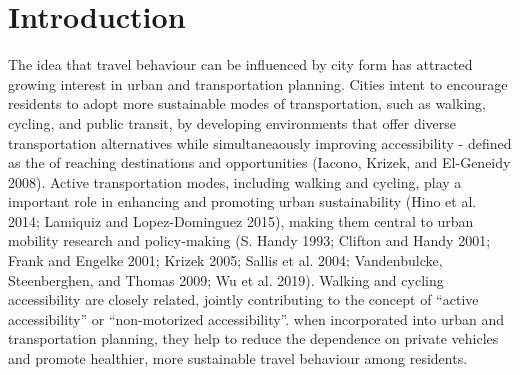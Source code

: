 \documentclass[preprint, 3p,
authoryear]{elsarticle} %
\begin{document}
\hypertarget{introduction}{%
\section{Introduction}\label{introduction}}

The idea that travel behaviour can be influenced by city form has
attracted growing interest in urban and transportation planning. Cities
intent to encourage residents to adopt more sustainable modes of
transportation, such as walking, cycling, and public transit, by
developing environments that offer diverse transportation alternatives
while simultaneaously improving accessibility - defined as the of
reaching destinations and opportunities (Iacono, Krizek, and El-Geneidy
2008). Active transportation modes, including walking and cycling, play
a important role in enhancing and promoting urban sustainability (Hino
et al. 2014; Lamiquiz and Lopez-Dominguez 2015), making them central to
urban mobility research and policy-making (S. Handy 1993; Clifton and
Handy 2001; Frank and Engelke 2001; Krizek 2005; Sallis et al. 2004;
Vandenbulcke, Steenberghen, and Thomas 2009; Wu et al. 2019). Walking
and cycling accessibility are closely related, jointly contributing to
the concept of ``active accessibility'' or ``non-motorized
accessibility''. when incorporated into urban and transportation
planning, they help to reduce the dependence on private vehicles and
promote healthier, more sustainable travel behaviour among residents.
\end{document}
